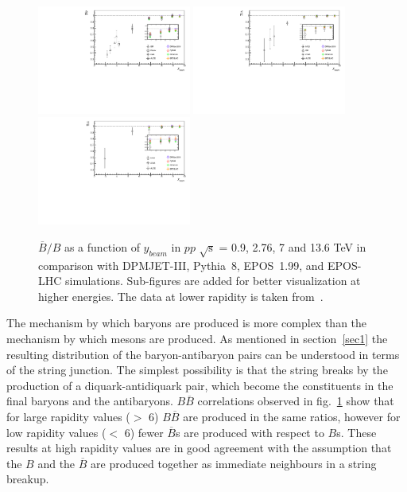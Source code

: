 \documentclass{article}
\newcommand{\sqrts}{\mbox{$\sqrt{\mathrm{s}}$}}
\begin{document}
\begin{figure}[!ht]
\centering
\includegraphics[width=0.45\textwidth,height=0.3\textheight]{p_barp_dely.pdf}
\includegraphics[width=0.45\textwidth,height=0.3\textheight]{l_lbar_dely.pdf}
\includegraphics[width=0.45\textwidth,height=0.3\textheight]{zai_azai_dely.pdf}
\caption{$\overline{B}/B$ as a function of $y_{beam}$ in $pp$ {\sqrts} = 0.9, 2.76, 7 and 13.6 TeV in comparison with DPMJET-III, Pythia~8, EPOS~1.99, and EPOS-LHC simulations. Sub-figures are added for better visualization at higher energies. The data at lower rapidity is taken from~\cite{47, 48, 49, 50, 51, 52, 53, 54, 55, 56, 57, 58, 59}.  }
\label{fig8}
\end{figure}

 The mechanism by which  baryons are produced is more complex than the mechanism by which mesons are produced. As mentioned in section~\ref{sec1} the resulting distribution of the baryon-antibaryon pairs can be understood in terms of the string junction.  The simplest possibility is that the string breaks by the production of a diquark-antidiquark pair, which become the  constituents in the final baryons and the antibaryons. $B\overline{B}$ correlations observed in fig.~\ref{fig8} show that for large rapidity values ($>$ 6)  $B\overline{B}$ are produced in the same ratios, however for low rapidity values ($<$ 6) fewer $\overline{B}$s are produced with respect to $B$s. These results at high rapidity values are in good agreement with the assumption that the $B$ and the $\overline{B}$ are produced together as immediate neighbours in a string breakup.
 
\end{document}
